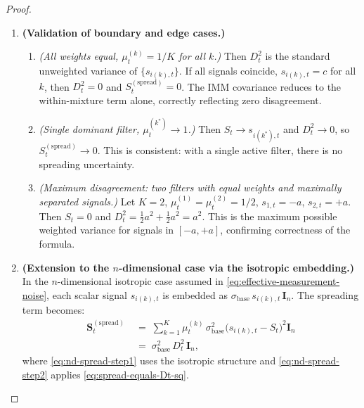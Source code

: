 \documentclass[12pt,openany]{book}
\numberwithin{equation}{chapter}
\theoremstyle{plain}
\theoremstyle{definition}
\theoremstyle{remark}
\begin{document}
\begin{proof}
\begin{enumerate}
  \item \textbf{(Validation of boundary and edge cases.)}
        \begin{enumerate}
          \item \emph{(All weights equal, $\mu_t^{(k)} = 1/K$
                for all $k$.)}
                Then $D_t^2$ is the standard unweighted variance
                of $\{s_{i(k),t}\}$.  If all signals coincide,
                $s_{i(k),t} = c$ for all $k$, then
                $D_t^2 = 0$ and
                $S_t^{(\mathrm{spread})} = 0$.
                The IMM covariance reduces to the within-mixture
                term alone, correctly reflecting zero
                disagreement.
          \item \emph{(Single dominant filter,
                $\mu_t^{(k^*)} \to 1$.)}
                Then $S_t \to s_{i(k^*),t}$ and
                $D_t^2 \to 0$, so
                $S_t^{(\mathrm{spread})} \to 0$.
                This is consistent: with a single active
                filter, there is no spreading uncertainty.
          \item \emph{(Maximum disagreement: two filters with
                equal weights and maximally separated signals.)}
                Let $K=2$, $\mu_t^{(1)} = \mu_t^{(2)} = 1/2$,
                $s_{1,t} = -a$, $s_{2,t} = +a$.
                Then $S_t = 0$ and
                $D_t^2 = \tfrac{1}{2}a^2 + \tfrac{1}{2}a^2 = a^2$.
                This is the maximum possible weighted variance
                for signals in $[-a,+a]$, confirming correctness
                of the formula.
        \end{enumerate}

  \item \textbf{(Extension to the $n$-dimensional case via
        the isotropic embedding.)}
        In the $n$-dimensional isotropic case assumed in
        \eqref{eq:effective-measurement-noise}, each scalar
        signal $s_{i(k),t}$ is embedded as
        $\sigma_{\mathrm{base}}\,s_{i(k),t}\,\mathbf{I}_n$.
        The spreading term becomes:
        \begin{align}
          \mathbf{S}_t^{(\mathrm{spread})}
          &\;=\;
          \sum_{k=1}^{K} \mu_t^{(k)}\,
          \sigma_{\mathrm{base}}^2
          \bigl(s_{i(k),t} - S_t\bigr)^2
          \mathbf{I}_n
          \label{eq:nd-spread-step1} \\
          &\;=\;
          \sigma_{\mathrm{base}}^2\,D_t^2\,\mathbf{I}_n,
          \label{eq:nd-spread-step2}
        \end{align}
        where \eqref{eq:nd-spread-step1} uses the
        isotropic structure and
        \eqref{eq:nd-spread-step2} applies
        \eqref{eq:spread-equals-Dt-sq}.


\end{enumerate}
\end{proof}
\end{document}
